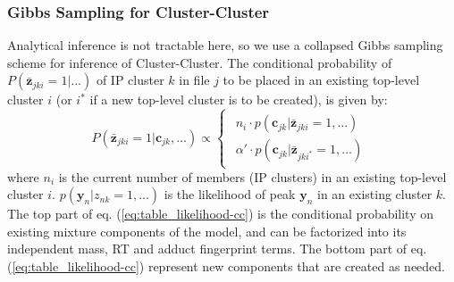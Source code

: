 \subsubsection{Gibbs Sampling for Cluster-Cluster\label{sub:cluster-cluster-gibbs}}

Analytical inference is not tractable here, so we use a collapsed Gibbs sampling scheme for inference of Cluster-Cluster. The conditional probability of $P(\boldsymbol{\bar{z}}_{jki}=1\vert...)$ of IP cluster $k$ in file $j$ to be placed in an existing top-level cluster $i$ (or $i^{*}$ if a new top-level cluster is to be created), is given by:
\begin{equation}
P(\boldsymbol{\bar{z}}_{jki}=1|\boldsymbol{c}_{jk},\ldots)\propto\begin{cases}
\begin{array}{c}
n_{i}\cdot p(\boldsymbol{c}_{jk}|\boldsymbol{\bar{z}}_{jki}=1,...)\\
\alpha'\cdot p(\boldsymbol{c}_{jk}|\boldsymbol{\bar{z}}_{jki^{*}}=1,...)
\end{array}\end{cases}\label{eq:table_likelihood-cc}
\end{equation}
where $n_{i}$ is the current number of members (IP clusters) in an existing top-level cluster $i$. $p(\mathbf{y}_{n}|z_{nk}=1,...)$ is the likelihood of peak $\mathbf{y}_{n}$ in an existing cluster $k$. The top part of eq. (\ref{eq:table_likelihood-cc}) is the conditional probability on existing mixture components of the model, and can be factorized into its independent mass, RT and adduct fingerprint terms. The bottom part of eq. (\ref{eq:table_likelihood-cc}) represent new components that are created as needed. 
